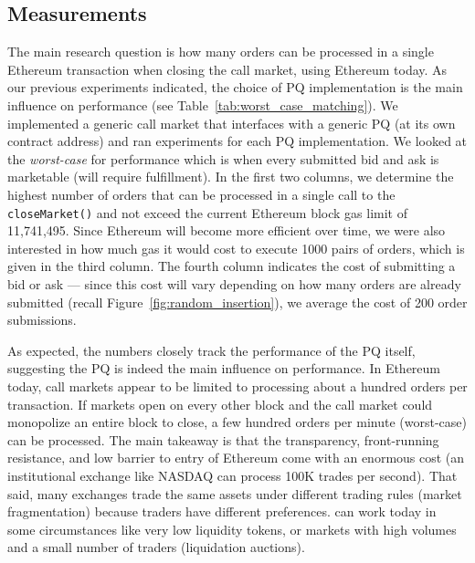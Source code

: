 
 \subsection{Measurements}
  
 
 
 
The main research question is how many orders can be processed in a single Ethereum transaction when closing the call market, using Ethereum today. As our previous experiments indicated, the choice of PQ implementation is the main influence on performance (see Table~\ref{tab:worst_case_matching}). We implemented a generic call market that interfaces with a generic PQ (at its own contract address) and ran experiments for each PQ implementation. We looked at the \textit{worst-case} for performance which is when every submitted bid and ask is marketable (\ie will require fulfillment). In the first two columns, we determine the highest number of orders that can be processed in a single call to the \texttt{closeMarket()} and not exceed the current Ethereum block gas limit of 11,741,495. Since Ethereum will become more efficient over time, we were also interested in how much gas it would cost to execute 1000 pairs of orders, which is given in the third column. The fourth column indicates the cost of submitting a bid or ask --- since this cost will vary depending on how many orders are already submitted (recall Figure~\ref{fig:random_insertion}), we average the cost of 200 order submissions. 

As expected, the numbers closely track the performance of the PQ itself, suggesting the PQ is indeed the main influence on performance. In Ethereum today, call markets appear to be limited to processing about a hundred orders per transaction. If markets open on every other block and the call market could monopolize an entire block to close, a few hundred orders per minute (worst-case) can be processed. The main takeaway is that the transparency, front-running resistance, and low barrier to entry of Ethereum come with an enormous cost (\ie an institutional exchange like NASDAQ can process 100K trades per second). That said, many exchanges trade the same assets under different trading rules (\ie market fragmentation) because traders have different preferences. \cm can work today in some circumstances like very low liquidity tokens, or markets with high volumes and a small number of traders (\eg liquidation auctions). 

